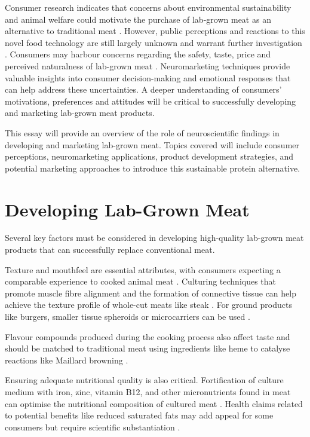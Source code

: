 \documentclass[10pt]{article}
\begin{document}
\begin{sloppypar}
  Consumer research indicates that concerns about environmental sustainability and animal welfare could motivate the purchase of lab-grown meat as an alternative to traditional meat \citep{circus_exploring_2018}. However, public perceptions and reactions to this novel food technology are still largely unknown and warrant further investigation \citep{verbeke_would_2015}. Consumers may harbour concerns regarding the safety, taste, price and perceived naturalness of lab-grown meat \citep{bryant_consumer_2018}. Neuromarketing techniques provide valuable insights into consumer decision-making and emotional responses that can help address these uncertainties. A deeper understanding of consumers’ motivations, preferences and attitudes will be critical to successfully developing and marketing lab-grown meat products.

  This essay will provide an overview of the role of neuroscientific findings in developing and marketing lab-grown meat. Topics covered will include consumer perceptions, neuromarketing applications, product development strategies, and potential marketing approaches to introduce this sustainable protein alternative.

  \section{Developing Lab-Grown Meat}
  \label{sec:developing-lab-grown-meat}

  Several key factors must be considered in developing high-quality lab-grown meat products that can successfully replace conventional meat.

  Texture and mouthfeel are essential attributes, with consumers expecting a comparable experience to cooked animal meat \citep{datar_possibilities_2010}. Culturing techniques that promote muscle fibre alignment and the formation of connective tissue can help achieve the texture profile of whole-cut meats like steak \citep{post_cultured_2012}. For ground products like burgers, smaller tissue spheroids or microcarriers can be used \citep{specht_opportunities_2018}.

  Flavour compounds produced during the cooking process also affect taste and should be matched to traditional meat using ingredients like heme to catalyse reactions like Maillard browning \citep{post_cultured_2012}.

  Ensuring adequate nutritional quality is also critical. Fortification of culture medium with iron, zinc, vitamin B12, and other micronutrients found in meat can optimise the nutritional composition of cultured meat \citep{fraeye_sensorial_2020}. Health claims related to potential benefits like reduced saturated fats may add appeal for some consumers but require scientific substantiation \citep{sergelidis_lab_2019}.


\end{sloppypar}
\end{document}
